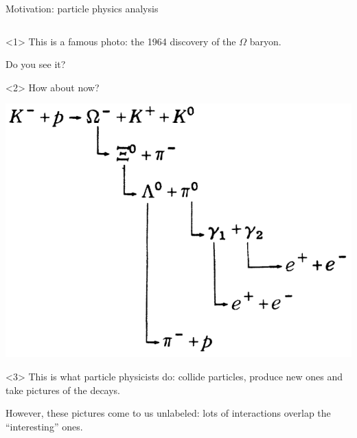 \documentclass[aspectratio=169]{beamer}
\begin{document}
\begin{frame}{Motivation: particle physics analysis}
\begin{columns}
\begin{center}
\begin{onlyenv}<1>
This is a famous photo: the 1964 discovery of the $\Omega$ baryon.

\vspace{1 cm}
Do you see it?

\vspace{1 cm}
\end{onlyenv}\begin{onlyenv}<2>
How about now?

\vspace{0.5 cm}
\includegraphics[width=\linewidth]{decay-chain.png}

\vspace{0.5 cm}

\end{onlyenv}\begin{onlyenv}<3>
This is what particle physicists do: collide particles, produce new ones and take pictures of the decays.

\vspace{1 cm}
However, these pictures come to us unlabeled: lots of interactions overlap the ``interesting'' ones.

\vspace{1 cm}
\end{onlyenv}
\end{center}

\end{columns}
\end{frame}
\end{document}
